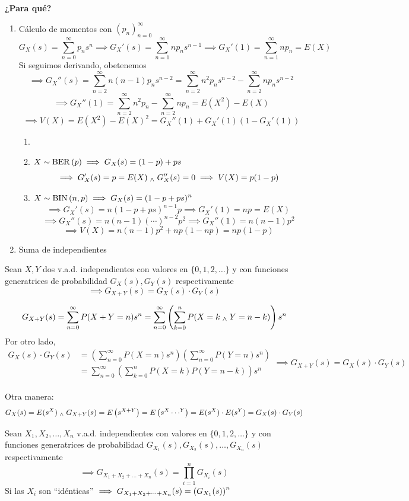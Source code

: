 \textbf{¿Para qué?}
\begin{enumerate}
	\item Cálculo de momentos con $(p_n)_{n=0}^\infty$
	      \[ G_X(s)=\sum_{n=0}^\infty p_ns^n \implies G_X'(s) = \sum_{n=1}^{\infty} np_n s^{n-1} \implies G_X'(1) = \sum_{n=1}^{\infty} n p_n = E(X)\]
	      Si seguimos derivando, obetenemos
	      \[\implies G_X''(s)= \sum_{n=2}^{\infty} n(n-1) p_n s^{n-2} = \sum_{n=2}^{\infty} n^2 p_n s^{n-2} - \sum_{n=2}^{\infty} n p_n s^{n-2}\]
	      \[\implies G_X''(1) = \sum_{n=2}^{\infty} n^2 p_n - \sum_{n=2}^{\infty} n p_n = E(X^2) - E(X)\]
	      \[\implies V(X)=E(X^2) - E(X)^2 = G_X''(1) + G_X'(1)\left(1-G_X'(1)\right)\]
	      \begin{ejem}
		      \begin{enumerate}
			      \item[]
			      \item $\displaystyle X\sim\operatorname{BER}\left(p\right) \implies G_X(s)=(1-p)+ps$
			            \[\implies G_X'(s)=p=E(X) \; _{\wedge} \; G_X''(s)=0 \implies V(X)=p(1-p)\]
			      \item $\displaystyle X\sim\operatorname{BIN}\left(n, p\right) \implies G_X(s)=(1-p+ps)^n$ \[\implies G_X'(s)=n(1-p+ps)^{n-1}p \implies G_X'(1)=np=E(X)\]
			            \[\implies G_X''(s)=n(n-1)(\cdots)^{n-2}p^2 \implies G_X''(1)=n(n-1)p^2\]
			            \[\implies V(X)=n(n-1)p^2+np(1-np)=np(1-p)\]

		      \end{enumerate}
	      \end{ejem}
	\item Suma de independientes
\end{enumerate}
\begin{teo}
	Sean $X, Y$ dos v.a.d. independientes con valores en $\{0, 1, 2, \dots\}$ y con funciones generatrices de probabilidad $G_X(s), G_Y(s)$ respectivamente
	\[\implies G_{X+Y}(s)=G_X(s)\cdot G_Y(s)\]
	\begin{dem}
		\[G_{X+Y}(s)=\sum_{n=0}^\infty P(X+Y=n)s^n = \sum_{n=0}^\infty \left(\sum_{k=0}^n P(X=k \; _{\wedge} \; Y=n-k)\right)s^n\]
		Por otro lado,
		\[\begin{aligned}G_X(s)\cdot G_Y(s) & = \left(\sum_{n=0}^\infty P(X=n)s^n\right)\left(\sum_{n=0}^\infty P(Y=n)s^n\right) \\
                                  & = \sum_{n=0}^\infty \left(\sum_{k=0}^n P(X=k)P(Y=n-k)\right)s^n\end{aligned}\implies G_{X+Y}(s)=G_X(s)\cdot G_Y(s)\]
		\hfill \qedsymbol\\
		Otra manera:
		\[G_X(s)=E(s^X) \; _{\wedge} \; G_{X+Y}(s)=E\left(s^{X+Y}\right) = E\left(s^X\cdots^Y\right)=E(s^X)\cdot E(s^Y) = G_X(s)\cdot G_Y(s)\]
	\end{dem}
\end{teo}
\begin{cor}
	Sean $X_1, X_2, \dots, X_n$ v.a.d. independientes con valores en $\{0, 1, 2, \dots\}$ y con funciones generatrices de probabilidad $G_{X_1}(s), G_{X_2}(s), \dots, G_{X_n}(s)$ respectivamente
	\[\implies G_{X_1+X_2+\dots+X_n}(s)=\prod_{i=1}^{n} G_{X_i}(s)\]
	Si las $X_i$ son ``idénticas'' $\displaystyle \implies G_{X_1+X_2+\dots+X_n}(s)=\left(G_{X_1}(s)\right)^n$
\end{cor}


